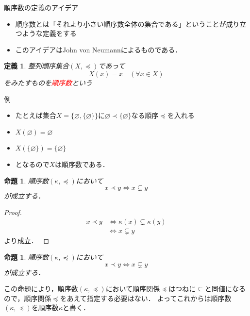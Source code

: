 \documentclass[dvipdfmx,17pt]{beamer}
\renewcommand{\subset}{\subseteq}
\renewcommand{\emptyset}{\varnothing}
\theoremstyle{plain}
\newtheorem{defi}[thm]{定義}
\newtheorem{prop}[thm]{命題}
\begin{document}
\begin{frame}{順序数の定義のアイデア}
\begin{itemize}
\item 順序数とは「それより小さい順序数全体の集合である」ということが成り立つような定義をする
\item このアイデアはJohn von Neumannによるものである．
\end{itemize}
\end{frame}

\begin{frame}
\begin{defi}
整列順序集合$(X, \preceq)$であって
\[X(x) = x \quad(\forall x \in X)\]
をみたすものを\textcolor{red}{順序数}という
\end{defi}
\end{frame}

\begin{frame}{例}
\begin{itemize}
\item たとえば集合$X = \{\emptyset, \{\emptyset\}\}$に$\emptyset \prec \{\emptyset\}$なる順序$\preceq$を入れる
\item $X(\emptyset) = \emptyset$
\item $X(\{\emptyset\}) = \{\emptyset\}$
\item となるので$X$は順序数である．
\end{itemize}
\end{frame}

\begin{frame}
\begin{prop}
順序数$(\kappa, \preceq)$において
\[x \prec y \iff x \subsetneq y\]
が成立する．
\end{prop}
\begin{proof}
{\small
\begin{align*}
x \prec y
&\iff \kappa(x) \subsetneq \kappa(y) \\
&\iff x \subsetneq y
\end{align*}
より成立．
}
\end{proof}
\end{frame}


\addtocounter{thm}{-1}

\begin{frame}
\begin{prop}
順序数$(\kappa, \preceq)$において
\[x \prec y \iff x \subsetneq y\]
が成立する．
\end{prop}
この命題により，順序数$(\kappa, \preceq)$において順序関係$\preceq$はつねに$\subset$と同値になるので，順序関係$\preceq$をあえて指定する必要はない．
よってこれからは順序数$(\kappa, \preceq)$を順序数$\kappa$と書く．
\end{frame}
\end{document}
